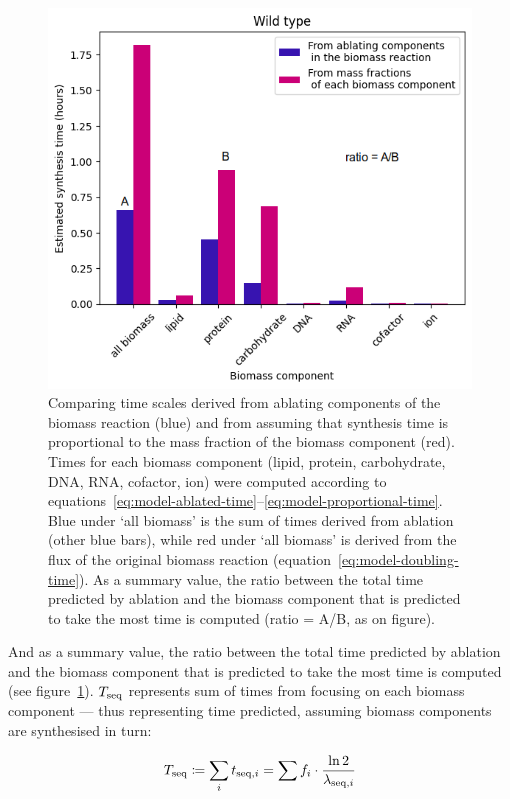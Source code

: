 \begin{figure}
  \centering
  \includegraphics[width=.9\linewidth]{ablation_example_ratio.png}
  \caption{
    Comparing time scales derived from ablating components of the biomass reaction (blue) and from assuming that synthesis time is proportional to the mass fraction of the biomass component (red).
    Times for each biomass component (lipid, protein, carbohydrate, DNA, RNA, cofactor, ion) were computed according to equations~\ref{eq:model-ablated-time}--\ref{eq:model-proportional-time}.
    Blue under `all biomass' is the sum of times derived from ablation (other blue bars), while red under `all biomass' is derived from the flux of the original biomass reaction (equation~\ref{eq:model-doubling-time}).
    As a summary value, the ratio between the total time predicted by ablation and the biomass component that is predicted to take the most time is computed (ratio = A/B, as on figure).
  }
  \label{fig:model-ablate-times}
\end{figure}

And as a summary value, the ratio between the total time predicted by ablation and the biomass component that is predicted to take the most time is computed (see figure~\ref{fig:model-ablate-times}).
$T_{\mathrm{seq}}$ represents sum of times from focusing on each biomass component --- thus representing time predicted, assuming biomass components are synthesised in turn:

\begin{equation}
  T_{\mathrm{seq}} \coloneqq \sum_{i} t_{\mathrm{seq},i} = \sum f_{i} \cdot \frac{\ln 2}{\lambda_{\mathrm{seq},i}}
  \label{eq:model-a}
\end{equation}

